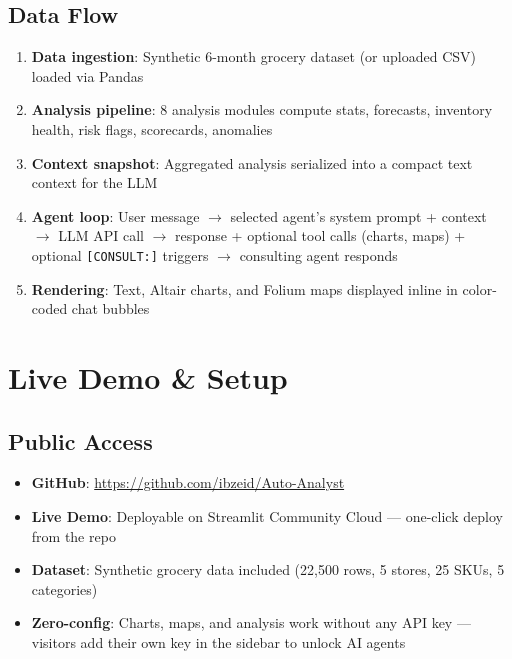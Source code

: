 \documentclass[11pt,a4paper]{article}
\begin{document}
\subsection{Data Flow}
\begin{enumerate}[leftmargin=*]
  \item \textbf{Data ingestion}: Synthetic 6-month grocery dataset (or uploaded CSV) loaded via Pandas
  \item \textbf{Analysis pipeline}: 8 analysis modules compute stats, forecasts, inventory health, risk flags, scorecards, anomalies
  \item \textbf{Context snapshot}: Aggregated analysis serialized into a compact text context for the LLM
  \item \textbf{Agent loop}: User message $\rightarrow$ selected agent's system prompt + context $\rightarrow$ LLM API call $\rightarrow$ response + optional tool calls (charts, maps) + optional \texttt{[CONSULT:]} triggers $\rightarrow$ consulting agent responds
  \item \textbf{Rendering}: Text, Altair charts, and Folium maps displayed inline in color-coded chat bubbles
\end{enumerate}

\section{Live Demo \& Setup}

\subsection{Public Access}
\begin{itemize}[leftmargin=*]
  \item \textbf{GitHub}: \url{https://github.com/ibzeid/Auto-Analyst}
  \item \textbf{Live Demo}: Deployable on Streamlit Community Cloud --- one-click deploy from the repo
  \item \textbf{Dataset}: Synthetic grocery data included (22,500 rows, 5 stores, 25 SKUs, 5 categories)
  \item \textbf{Zero-config}: Charts, maps, and analysis work without any API key --- visitors add their own key in the sidebar to unlock AI agents
\end{itemize}
\end{document}
